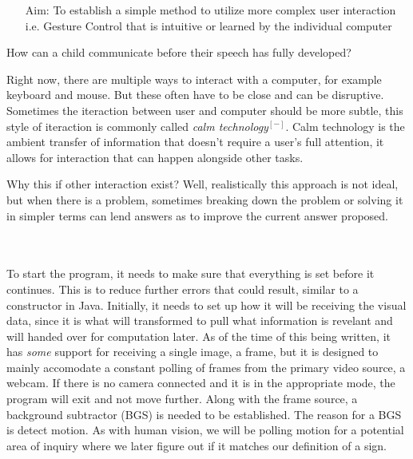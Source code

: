 \documentclass[letterpaper,11pt]{article}
\begin{document}
\newpage


\begin{enumerate}
\item[Aim:] To establish a simple method to utilize more complex user interaction i.e. Gesture Control that is intuitive or learned by the individual computer
\end{enumerate}

How can a child communicate before their speech has fully developed? 

Right now, there are multiple ways to interact with a computer, for example keyboard and mouse. But these often have to be close and can be disruptive. Sometimes the iteraction between user and computer should be more subtle, this style of iteraction is commonly called \emph{calm technology}$^{[-]}$. Calm technology is the ambient transfer of information that doesn't require a user's full attention, it allows for interaction that can happen alongside other tasks.

Why this if other interaction exist? Well, realistically this approach is not ideal, but when there is a problem, sometimes breaking down the problem or solving it in simpler terms can lend answers as to improve the current answer proposed.

\newpage

\\

\\

To start the program, it needs to make sure that everything is set before it continues. This is to reduce further errors that could result, similar to a constructor in Java. 
Initially, it needs to set up how it will be receiving the visual data, since it is what will transformed to pull what information is revelant and will handed over for computation later. As of the time of this being written, it has \emph{some} support for receiving a single image, a frame, but it is designed to mainly accomodate a constant polling of frames from the primary video source, a webcam. If there is no camera connected and it is in the appropriate mode, the program will exit and not move further.
Along with the frame source, a background subtractor (BGS) is needed to be established. The reason for a BGS is detect motion. As with human vision, we will be polling motion for a potential area of inquiry where we later figure out if it matches our definition of a sign.
\\
\end{document}
